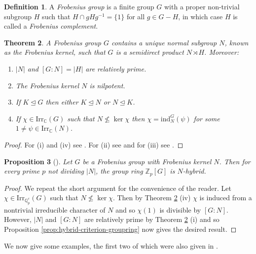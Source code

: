 \documentclass[12pt]{amsart}
\theoremstyle{plain}
\newtheorem{theorem}{Theorem}[section]
\newtheorem{prop}[theorem]{Proposition}
\theoremstyle{remark}
\theoremstyle{definition}
\newtheorem{definition}[theorem]{Definition}
\numberwithin{equation}{section}
\begin{document}
\begin{definition}
A \emph{Frobenius group} is a finite group $G$ with a proper non-trivial subgroup $H$
such that $H \cap gHg^{-1}=\{ 1 \}$ for all $g \in G-H$,
in which case $H$ is called a \emph{Frobenius complement}.
\end{definition}

\begin{theorem}\label{thm:frob-kernel}
A Frobenius group $G$ contains a unique normal subgroup $N$, known as the Frobenius kernel, such that
$G$ is a semidirect product $N \rtimes H$. Moreover:
\begin{enumerate}
\item $|N|$ and $[G:N]=|H|$ are relatively prime.
\item The Frobenius kernel $N$ is nilpotent.
\item If $K \unlhd G $ then either $K \unlhd N$ or $N \unlhd K$.
\item If $\chi \in {\mathrm{Irr}}_{\mathbb{C}}(G)$ such that  $N \not \leq \ker \chi$ then $\chi= {\mathrm{ind}}_{N}^{G}(\psi)$ for some $1 \neq \psi \in {\mathrm{Irr}}_{\mathbb{C}}(N)$.
\end{enumerate}
\end{theorem}

\begin{proof}
For (i) and (iv) see \cite[\S 14A]{MR632548}.
For (ii) see \cite[10.5.6]{MR1357169} and for (iii) see  \cite[Exercise 7, \S 8.5]{MR1357169}.
\end{proof}

\begin{prop}[{\cite[Proposition 2.13]{hybrid-ETNC}}]\label{prop:frob-N-hybrid}
Let $G$ be a Frobenius group with Frobenius kernel $N$.
Then for every prime $p$ not dividing $|N|$, the group ring ${\mathbb{Z}}_{p}[G]$ is $N$-hybrid.
\end{prop}

\begin{proof}
We repeat the short argument for the convenience of the reader.
Let $\chi \in {\mathrm{Irr}}_{{\mathbb{Q}}_{p}^{c}}(G)$ such that $N \not \leq \ker \chi$.
Then by Theorem \ref{thm:frob-kernel} (iv) $\chi$ is induced from a nontrivial irreducible character
of $N$ and so $\chi(1)$ is divisible by $[G:N]$.
However, $|N|$ and $[G:N]$ are relatively prime by Theorem \ref{thm:frob-kernel} (i) and so
Proposition \ref{prop:hybrid-criterion-groupring} now gives the desired result.
\end{proof}

We now give some examples, the first two of which were also given in \cite[\S 2.3]{hybrid-ETNC}.
\end{document}

